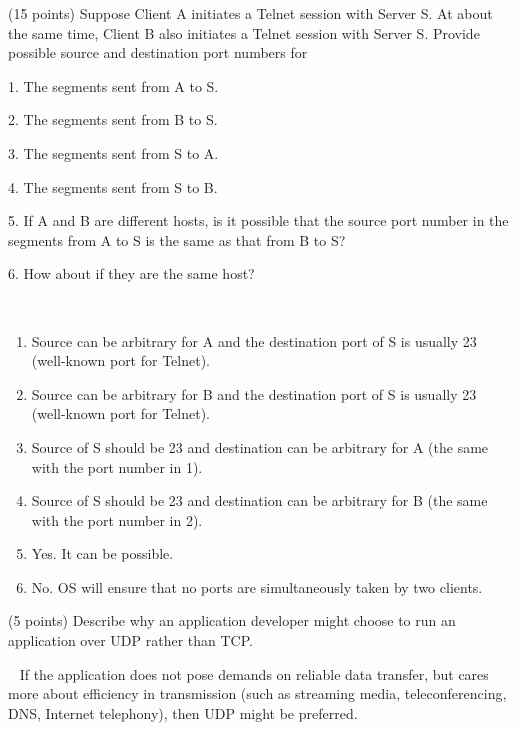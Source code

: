 \begin{exercise}[]{(15 points) Suppose Client A initiates a Telnet session with Server S. At about the same time, Client B also initiates a Telnet session with Server S. Provide possible source and destination port numbers for

    1. The segments sent from A to S.

    2. The segments sent from B to S.
    
    3. The segments sent from S to A.
    
    4. The segments sent from S to B.
    
    5. If A and B are different hosts, is it possible that the source port number in the segments from A to S is the same as that from B to S?
    
    6. How about if they are the same host?}
  \begin{solution}
  \par{~}
  \begin{enumerate}
      \item Source can be arbitrary for A and the destination port of S is usually 23 (well-known port for Telnet).
      \item Source can be arbitrary for B and the destination port of S is usually 23 (well-known port for Telnet).
      \item Source of S should be 23 and destination can be arbitrary for A (the same with the port number in 1).
      \item Source of S should be 23 and destination can be arbitrary for B (the same with the port number in 2).
      \item Yes. It can be possible.
      \item No. OS will ensure that no ports are simultaneously taken by two clients.
  \end{enumerate}
  \end{solution}
  \label{ex2}
\end{exercise}


\begin{exercise}[]{(5 points) Describe why an application developer might choose to run an application over UDP rather than TCP.}
  \begin{solution}
  \par{~}
  If the application does not pose demands on reliable data transfer, but cares more about efficiency in transmission (such as streaming media, teleconferencing, DNS, Internet telephony), then UDP might be preferred.  
  \end{solution}
  \label{ex3}
\end{exercise}


